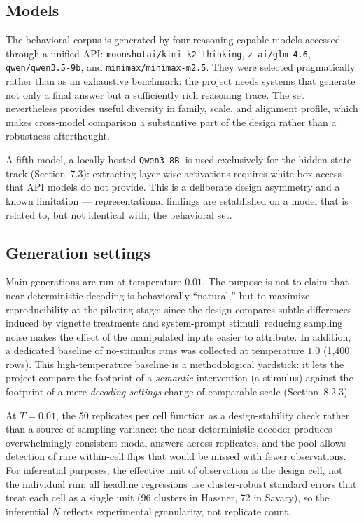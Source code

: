 \documentclass[14pt,a4paper]{extarticle}
\begin{document}
\subsection{Models}

The behavioral corpus is generated by four reasoning-capable models accessed through a unified API: \texttt{moonshotai/kimi-k2-thinking}, \texttt{z-ai/glm-4.6}, \texttt{qwen/qwen3.5-9b}, and \texttt{minimax/minimax-m2.5}. They were selected pragmatically rather than as an exhaustive benchmark: the project needs systems that generate not only a final answer but a sufficiently rich reasoning trace. The set nevertheless provides useful diversity in family, scale, and alignment profile, which makes cross-model comparison a substantive part of the design rather than a robustness afterthought.

A fifth model, a locally hosted \texttt{Qwen3-8B}, is used exclusively for the hidden-state track (Section~7.3): extracting layer-wise activations requires white-box access that API models do not provide. This is a deliberate design asymmetry and a known limitation --- representational findings are established on a model that is related to, but not identical with, the behavioral set.

\subsection{Generation settings}

Main generations are run at temperature $0.01$. The purpose is not to claim that near-deterministic decoding is behaviorally ``natural,'' but to maximize reproducibility at the piloting stage: since the design compares subtle differences induced by vignette treatments and system-prompt stimuli, reducing sampling noise makes the effect of the manipulated inputs easier to attribute. In addition, a dedicated baseline of no-stimulus runs was collected at temperature $1.0$ (1{,}400 rows). This high-temperature baseline is a methodological yardstick: it lets the project compare the footprint of a \emph{semantic} intervention (a stimulus) against the footprint of a mere \emph{decoding-settings} change of comparable scale (Section~8.2.3).

At $T = 0.01$, the 50 replicates per cell function as a design-stability check rather than a source of sampling variance: the near-deterministic decoder produces overwhelmingly consistent modal answers across replicates, and the pool allows detection of rare within-cell flips that would be missed with fewer observations. For inferential purposes, the effective unit of observation is the design cell, not the individual run; all headline regressions use cluster-robust standard errors that treat each cell as a single unit (96 clusters in Hassner, 72 in Savary), so the inferential $N$ reflects experimental granularity, not replicate count.
\end{document}
